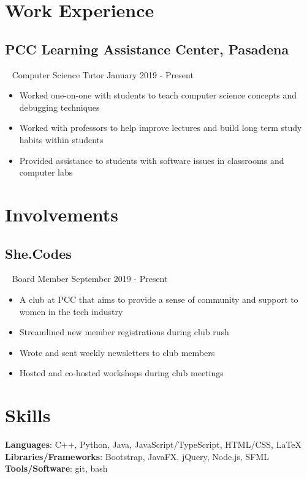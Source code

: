 \documentclass{article}
\newcommand{\resumesection}[3]{
    \subsection*{#1}
    \ 
    \footnotesize
    \textcolor{wordgrey}{#2}
    \normalsize
    \hfill
    \textcolor{wordgrey}{#3}
}
\begin{document}
\section*{Work Experience}
\resumesection{PCC Learning Assistance Center, Pasadena}{Computer Science Tutor}{January 2019 - Present}
\begin{itemize}
    \item Worked one-on-one with students to teach computer science concepts and debugging techniques
    \item Worked with professors to help improve lectures and build long term study habits within students
    \item Provided assistance to students with software issues in classrooms and computer labs
\end{itemize}
\hfill

\section*{Involvements}
\resumesection{She.Codes}{Board Member}{September 2019 - Present}
\begin{itemize}
    \item A club at PCC that aims to provide a sense of community and support to women in the tech industry
    \item Streamlined new member registrations during club rush
    \item Wrote and sent weekly newsletters to club members
    \item Hosted and co-hosted workshops during club meetings
\end{itemize}
\hfill

\section*{Skills}
\textbf{Languages}: C++, Python, Java, JavaScript/TypeScript, HTML/CSS, {\selectfont\LaTeX}\\
\textbf{Libraries/Frameworks}: Bootstrap, JavaFX, jQuery, Node.js, SFML\\
\textbf{Tools/Software}: git, bash
\end{document}
